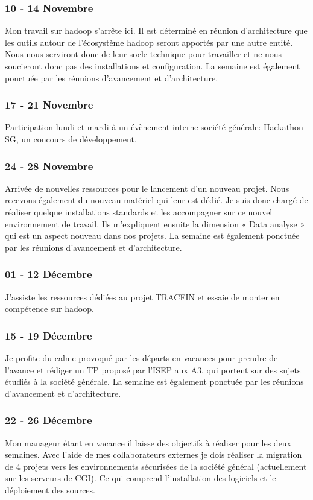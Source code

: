 \subsubsection*{10 - 14 Novembre}
Mon travail sur hadoop s’arrête ici. Il est déterminé en réunion d’architecture que les outils autour de l’écosystème hadoop seront apportés par une autre entité. Nous nous serviront donc de leur socle technique pour travailler et ne nous soucieront donc pas des installations et configuration. La semaine est également ponctuée par les réunions d’avancement et d’architecture. 
\subsubsection*{17 - 21 Novembre}
Participation lundi et mardi à un évènement interne société générale: Hackathon SG, un concours de développement.
\subsubsection*{24 - 28 Novembre}
Arrivée de nouvelles ressources pour le lancement d’un nouveau projet. Nous recevons également du nouveau matériel qui leur est dédié. Je suis donc chargé de réaliser quelque installations standards et les accompagner sur ce nouvel environnement de travail. Ils m’expliquent ensuite la dimension « Data analyse » qui est un aspect nouveau dans nos projets. La semaine est également ponctuée par les réunions d’avancement et d’architecture.
\subsubsection*{01 - 12 Décembre}
J’assiste les ressources dédiées au projet TRACFIN et essaie de monter en compétence sur hadoop. 
\subsubsection*{15 - 19 Décembre}
Je profite du calme provoqué par les départs en vacances pour prendre de l’avance et rédiger un TP proposé par l’ISEP aux A3, qui portent sur des sujets étudiés à la société générale. La semaine est également ponctuée par les réunions d’avancement et d’architecture.
\subsubsection*{22 - 26 Décembre}
Mon manageur étant en vacance il laisse des objectifs à réaliser pour les deux semaines. Avec l’aide de mes collaborateurs externes je dois réaliser la migration de 4 projets vers les environnements sécurisées de la société général (actuellement sur les serveurs de CGI). Ce qui comprend l’installation des logiciels et le déploiement des sources.
